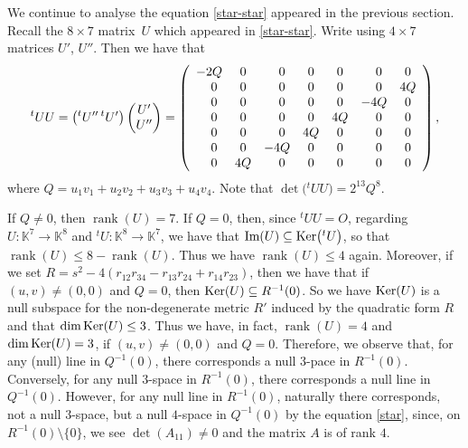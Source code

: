 \documentclass[pdftex]{sigma}
\numberwithin{equation}{section}
\theoremstyle{definition}
\newcommand{\KK}{\mathbb{K}}
\newcommand{\0}{\boldsymbol{0}}
\newcommand{\rank}{\operatorname{rank}}
\begin{document}
We continue to analyse the equation \eqref{star-star} appeared in the previous section.
Recall the $8\times7$ matrix~$U$ which appeared in \eqref{star-star}.
Write  using $4\times 7$ matrices $U'$, $U''$.
Then we have that
\[
{}^tU U = \bigl({}^tU'' \, {}^t U'\bigr)\begin{pmatrix}U' \\ U''\end{pmatrix}
=
\left(
\begin{array}{ccccccc}
-2Q & 0 & \hphantom{-}0 & 0 & 0 & \hphantom{-}0 & 0
\\
\hphantom{-}0 & 0 & \hphantom{-}0 & 0 & 0 & \hphantom{-}0 & 4Q
\\
\hphantom{-}0 & 0 & \hphantom{-}0 & 0 & 0 & -4Q & 0
\\
\hphantom{-}0 & 0 & \hphantom{-}0 & 0 & 4Q & \hphantom{-}0 & 0
\\
\hphantom{-}0 & 0 & \hphantom{-}0 & 4Q & 0 & \hphantom{-}0 & 0
\\
\hphantom{-}0 & 0 & -4Q & 0 & 0 & \hphantom{-}0 & 0
\\
\hphantom{-}0 & 4Q & \hphantom{-}0 & 0 & 0 & \hphantom{-}0 & 0
\end{array}
\right),
\]
where $Q = u_1v_1 + u_2v_2 + u_3v_3 + u_4v_4$. Note that $\det\bigl({}^tU U\bigr) = 2^{13} Q^8$.

If $Q \not= 0$, then $\rank(U) = 7$. If $Q = 0$, then, since
${}^tU U = O$, regarding $U \colon \KK^7 \to \KK^8$ and
${}^tU \colon \KK^8 \to \KK^7$,
we have that ${\mbox{\rm Im}}(U) \subseteq {\rm Ker}\bigl({}^tU\bigr)$,
so that $\rank(U) \leq 8 - \rank(U)$. Thus we have $\rank(U) \leq 4$ again.
Moreover, if we set
$R = s^2 - 4(r_{12}r_{34} - r_{13}r_{24} + r_{14}r_{23})$, then
we have that if $(u, v) \not= (0, 0)$ and $Q = 0$, then ${\rm Ker}(U) \subseteq R^{-1}(0)$.
So we have ${\rm Ker}(U)$ is a null subspace for the non-degenerate
metric $R'$ induced by the quadratic form $R$ and that
$\dim{\rm Ker}(U) \leq 3$. Thus we have, in fact, $\rank(U) = 4$ and $\dim{\rm Ker}(U) = 3$, if $(u, v) \not= (0, 0)$ and $Q = 0$.
Therefore, we observe that, for any (null) line in $Q^{-1}(0)$, there corresponds a null $3$-pace in $R^{-1}(0)$.
Conversely, for any null $3$-space in $R^{-1}(0)$, there corresponds a null line in $Q^{-1}(0)$.
However, for any null line in $R^{-1}(0)$, naturally there corresponds,
not a null $3$-space, but a null $4$-space in $Q^{-1}(0)$
by the equation \eqref{star}, since, on $R^{-1}(0) \setminus \{ 0\}$, we see $\det(A_{11}) \not= 0$ and the matrix
$A$ is of rank $4$.
\end{document}
